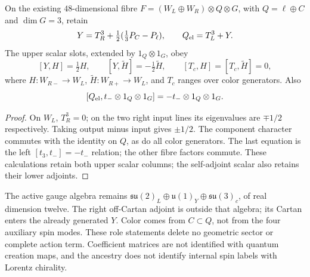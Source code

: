 \documentclass[11pt,a4paper]{article}
\begin{document}
\begin{lemma}
\label{p5:lem:v2174-field-dictionary-charges}
On the existing $48$-dimensional fibre
$F=(W_L\oplus W_R)\otimes Q\otimes G$, with
$Q=\ell\oplus C$ and $\dim G=3$, retain
\[
 Y=T_R^3+\tfrac12(\tfrac13P_C-P_\ell),\qquad Q_{\rm el}=T_L^3+Y.
\]
The upper scalar slots, extended by $1_Q\otimes1_G$, obey
\[
 [Y,H]=\tfrac12H,\qquad [Y,\widetilde H]=-\tfrac12\widetilde H,
 \qquad [T_c,H]=[T_c,\widetilde H]=0,
\]
where $H:W_{R-}\to W_L$, $\widetilde H:W_{R+}\to W_L$, and $T_c$
ranges over color generators. Also
\[
 [Q_{\rm el},t_-\otimes1_Q\otimes1_G]
       =-t_-\otimes1_Q\otimes1_G.
\]
\end{lemma}
\begin{proof}
On $W_L$, $T_R^3=0$; on the two right input lines its eigenvalues are
$\mp1/2$ respectively. Taking output minus input gives $\pm1/2$.
The component character commutes with the identity on $Q$, as do all color
generators. The last equation is the left $[t_3,t_-]=-t_-$ relation;
the other fibre factors commute. These calculations retain both upper
scalar columns; the self-adjoint scalar also retains their lower adjoints.
\end{proof}
The active gauge algebra remains
$\mathfrak{su}(2)_L\oplus\mathfrak u(1)_Y\oplus\mathfrak{su}(3)_c$,
of real dimension twelve. The right off-Cartan adjoint is outside that
algebra; its Cartan enters the already generated $Y$. Color comes from
$C\subset Q$, not from the four auxiliary spin modes. These role statements
delete no geometric sector or complete action term. Coefficient matrices
are not identified with quantum creation maps, and the ancestry does not
identify internal spin labels with Lorentz chirality.





\end{document}

